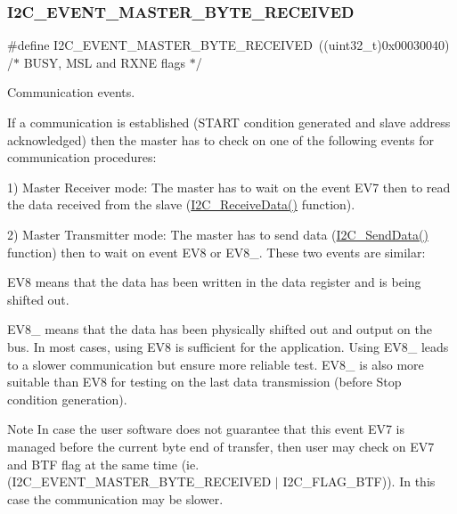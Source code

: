 \subsubsection{\texorpdfstring{I2C\_EVENT\_MASTER\_BYTE\_RECEIVED}{I2C\_EVENT\_MASTER\_BYTE\_RECEIVED}}
{\footnotesize\ttfamily \#define I2\+C\+\_\+\+E\+V\+E\+N\+T\+\_\+\+M\+A\+S\+T\+E\+R\+\_\+\+B\+Y\+T\+E\+\_\+\+R\+E\+C\+E\+I\+V\+ED~((uint32\+\_\+t)0x00030040)  /$\ast$ B\+U\+S\+Y, M\+S\+L and R\+X\+N\+E flags $\ast$/}



Communication events. 

If a communication is established (S\+T\+A\+RT condition generated and slave address acknowledged) then the master has to check on one of the following events for communication procedures\+:

1) Master Receiver mode\+: The master has to wait on the event E\+V7 then to read the data received from the slave (\mbox{\hyperlink{group___i2_c___exported___functions_gaeaaa4b6f77f50eb57465148c55d27fb2}{I2\+C\+\_\+\+Receive\+Data()}} function).

2) Master Transmitter mode\+: The master has to send data (\mbox{\hyperlink{group___i2_c___exported___functions_ga7bd9e70b8eafde0dd5eb42b0d95fe1a9}{I2\+C\+\_\+\+Send\+Data()}} function) then to wait on event E\+V8 or E\+V8\+\_. These two events are similar\+:
\begin{DoxyItemize}
\item E\+V8 means that the data has been written in the data register and is being shifted out.
\item E\+V8\+\_ means that the data has been physically shifted out and output on the bus. In most cases, using E\+V8 is sufficient for the application. Using E\+V8\+\_ leads to a slower communication but ensure more reliable test. E\+V8\+\_ is also more suitable than E\+V8 for testing on the last data transmission (before Stop condition generation).
\end{DoxyItemize}

\begin{DoxyNote}{Note}
In case the user software does not guarantee that this event E\+V7 is managed before the current byte end of transfer, then user may check on E\+V7 and B\+TF flag at the same time (ie. (I2\+C\+\_\+\+E\+V\+E\+N\+T\+\_\+\+M\+A\+S\+T\+E\+R\+\_\+\+B\+Y\+T\+E\+\_\+\+R\+E\+C\+E\+I\+V\+ED $\vert$ I2\+C\+\_\+\+F\+L\+A\+G\+\_\+\+B\+TF)). In this case the communication may be slower. 
\end{DoxyNote}
\mbox{\label{group___i2_c___events_ga8fe3b96b54e3c38e1de5d48536039c8f}} 
